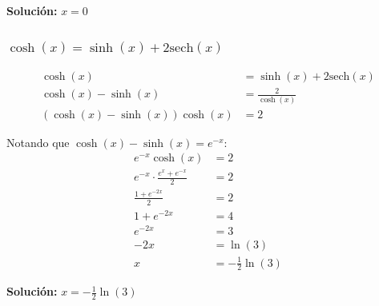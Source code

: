 \documentclass{article}
\begin{document}
\textbf{Solución:} $x = 0$

\subsubsection*{$\cosh(x) = \sinh(x) + 2\text{sech}(x)$}

\begin{align*}
\cosh(x) &= \sinh(x) + 2\text{sech}(x) \\
\cosh(x) - \sinh(x) &= \frac{2}{\cosh(x)} \\
(\cosh(x) - \sinh(x))\cosh(x) &= 2
\end{align*}

Notando que $\cosh(x) - \sinh(x) = e^{-x}$:
\begin{align*}
e^{-x}\cosh(x) &= 2 \\
e^{-x} \cdot \frac{e^x + e^{-x}}{2} &= 2 \\
\frac{1 + e^{-2x}}{2} &= 2 \\
1 + e^{-2x} &= 4 \\
e^{-2x} &= 3 \\
-2x &= \ln(3) \\
x &= -\frac{1}{2}\ln(3)
\end{align*}

\textbf{Solución:} $x = -\frac{1}{2}\ln(3)$
\end{document}
